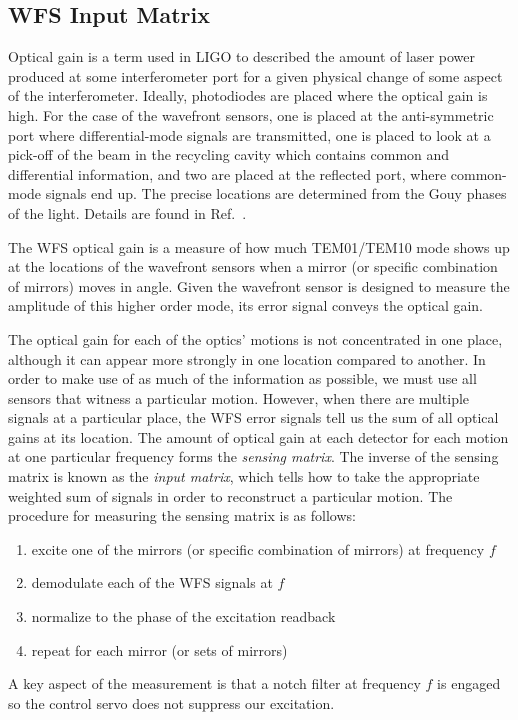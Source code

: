 \subsection{WFS Input Matrix}
Optical gain is a term used in LIGO to described the amount of laser
power produced at some interferometer port for a given physical change
of some aspect of the interferometer. Ideally, photodiodes are placed
where the optical gain is high. For the case of the wavefront sensors,
one is placed at the anti-symmetric port where differential-mode
signals are transmitted, one is placed to look at a pick-off of the
beam in the recycling cavity which contains common and differential
information, and two are placed at the reflected port, where
common-mode signals end up. The precise locations are determined from
the Gouy phases of the light. Details are found in
Ref.~\cite{Barsotti2009Modeling}. 

The WFS optical gain is a measure of how much TEM01/TEM10 mode shows
up at the locations of the wavefront sensors when a mirror (or
specific combination of mirrors) moves in angle. Given the wavefront
sensor is designed to measure the amplitude of this higher order mode,
its error signal conveys the optical gain.

The optical gain for each of the optics' motions is not concentrated
in one place, although it can appear more strongly in one location
compared to another. In order to make use of as much of the
information as possible, we must use all sensors that witness a
particular motion. However, when there are multiple signals at a
particular place, the WFS error signals tell us the sum of all optical
gains at its location. The amount of optical gain at each detector for
each motion at one particular frequency forms the \emph{sensing
  matrix}. The inverse of the sensing matrix is known as the
\emph{input matrix}, which tells how to take the appropriate weighted
sum of signals in order to reconstruct a particular motion. The
procedure for measuring the sensing matrix is as follows:
\begin{enumerate}
\item excite one of the mirrors (or specific combination of mirrors)
  at frequency $f$ \vspace{-10pt}
\item demodulate each of the WFS signals at $f$ \vspace{-10pt}
\item normalize to the phase of the excitation readback \vspace{-10pt}
\item repeat for each mirror (or sets of mirrors)
\end{enumerate}
A key aspect of the measurement is that a notch filter at frequency
$f$ is engaged so the control servo does not suppress our excitation.

